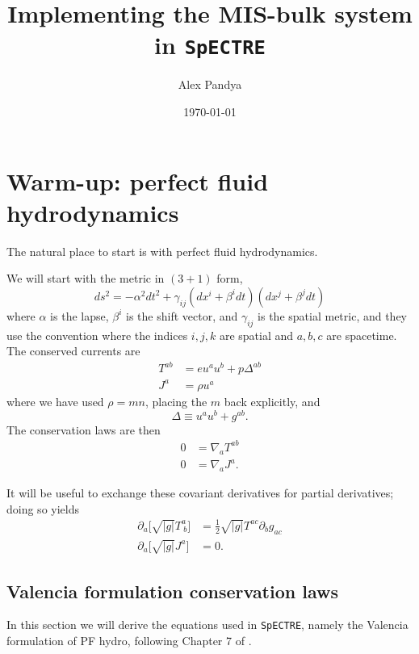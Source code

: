 \documentclass[12pt]{article}
\numberwithin{equation}{section}
\begin{document}
\title{Implementing the MIS-bulk system in {\tt SpECTRE}}
\author{Alex Pandya}
\date{\today}
\maketitle
\tableofcontents
\clearpage

\section{Warm-up: perfect fluid hydrodynamics}

The natural place to start is with perfect fluid hydrodynamics.

We will start with the metric in $(3+1)$ form,
\begin{equation}
ds^2 = - \alpha^2 dt^2 + \gamma_{ij} (dx^i + \beta^i dt) (dx^j + \beta^j dt)
\end{equation}
where $\alpha$ is the lapse, $\beta^{i}$ is the shift vector, and $\gamma_{ij}$
is the spatial metric, and they use the convention where the indices $i,j,k$
are spatial and $a,b,c$ are spacetime.
The conserved currents are
\begin{align}
T^{ab} &= e u^a u^b + p \Delta^{ab} \\
J^{a} &= \rho u^a
\end{align}
where we have used $\rho = m n$, placing the $m$ back explicitly, and
\begin{equation}
\Delta \equiv u^a u^b + g^{ab}.
\end{equation}
The conservation laws are then
\begin{align}
0 &= \nabla_{a} T^{ab} \\
0 &= \nabla_{a} J^{a}.
\end{align}

It will be useful to exchange these covariant derivatives for partial derivatives; doing so yields
\begin{align}
\partial_a \big[ \sqrt{|g|} T^{a}_{~b} \big] &= \frac{1}{2} \sqrt{|g|} T^{ac} \partial_{b} g_{ac} \\
\partial_a \big[ \sqrt{|g|} J^{a} \big] &= 0.
\end{align}

\subsection{Valencia formulation conservation laws}

In this section we will derive the equations used in {\tt SpECTRE}, namely the Valencia formulation of PF hydro, following Chapter 7 of \cite{RezzollaZanotti}.
\end{document}
